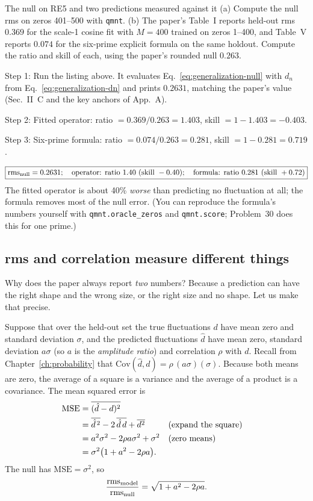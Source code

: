 \begin{sample}{The null on RE5 and two predictions measured against it}
(a) Compute the null rms on zeros 401--500 with \texttt{qmnt}. (b) The paper's Table~I reports held-out rms $0.369$ for the scale-1 cosine fit with $M=400$ trained on zeros 1--400, and Table~V reports $0.074$ for the six-prime explicit formula on the same holdout. Compute the ratio and skill of each, using the paper's rounded null $0.263$.

Step 1: Run the listing above. It evaluates Eq.~\eqref{eq:generalization-null} with $d_n$ from Eq.~\eqref{eq:generalization-dn} and prints $0.2631$, matching the paper's value (Sec.~II~C and the key anchors of App.~A).

Step 2: Fitted operator: ratio $=0.369/0.263=1.403$, skill $=1-1.403=-0.403$.

Step 3: Six-prime formula: ratio $=0.074/0.263=0.281$, skill $=1-0.281=0.719$.

\[
\boxed{\mathrm{rms}_{\rm null}=0.2631;\quad \text{operator: ratio }1.40\ (\text{skill }-0.40);\quad \text{formula: ratio }0.281\ (\text{skill }+0.72)}
\]
The fitted operator is about 40\% \emph{worse} than predicting no fluctuation at all; the formula removes most of the null error. (You can reproduce the formula's numbers yourself with \texttt{qmnt.oracle\_zeros} and \texttt{qmnt.score}; Problem~30 does this for one prime.)
\end{sample}

\subsection{rms and correlation measure different things}

Why does the paper always report \emph{two} numbers? Because a prediction can have the right shape and the wrong size, or the right size and no shape. Let us make that precise.

Suppose that over the held-out set the true fluctuations $d$ have mean zero and standard deviation $\sigma$, and the predicted fluctuations $\hat d$ have mean zero, standard deviation $a\sigma$ (so $a$ is the \emph{amplitude ratio}) and correlation $\rho$ with $d$. Recall from Chapter~\ref{ch:probability} that $\mathrm{Cov}(\hat d,d)=\rho\,(a\sigma)(\sigma)$. Because both means are zero, the average of a square is a variance and the average of a product is a covariance. The mean squared error is
\begin{align}
\mathrm{MSE}&=\overline{(\hat d-d)^2}\notag\\
&=\overline{\hat d^{\,2}}-2\,\overline{\hat d\,d}+\overline{d^2}&&\text{(expand the square)}\notag\\
&=a^2\sigma^2-2\rho a\sigma^2+\sigma^2&&\text{(zero means)}\notag\\
&=\sigma^2\bigl(1+a^2-2\rho a\bigr).
\end{align}
The null has $\mathrm{MSE}=\sigma^2$, so
\begin{equation}
\frac{\mathrm{rms}_{\rm model}}{\mathrm{rms}_{\rm null}}=\sqrt{1+a^2-2\rho a}.
\label{eq:generalization-ratio}
\end{equation}

